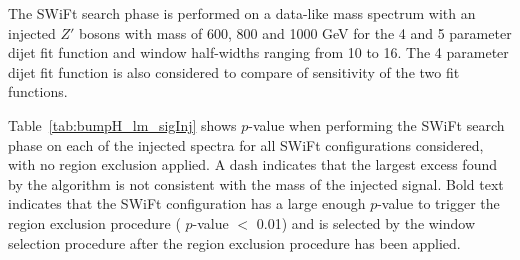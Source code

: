 The  SWiFt search phase is performed on a data-like mass spectrum
with an injected $Z'$ bosons with mass of 600, 800 and 1000 GeV
for the 4 and 5 parameter dijet fit function and window half-widths ranging from 10 to 16.
The 4 parameter dijet fit function is also considered to compare of sensitivity of the two fit functions.

Table~\ref{tab:bumpH_lm_sigInj} shows \bh{} \mbox{$p$-value} 
when performing the SWiFt search phase on each of the injected spectra
for all SWiFt configurations considered, with no region exclusion applied.
A dash indicates that the largest excess found by the \bh{} algorithm is not consistent with the mass of the injected signal.
Bold text indicates that the SWiFt configuration has a large enough $p$-value
to trigger the region exclusion procedure (\bh{} $p$-value $<$ 0.01)
and is selected by the window selection procedure after the region exclusion procedure has been applied.


